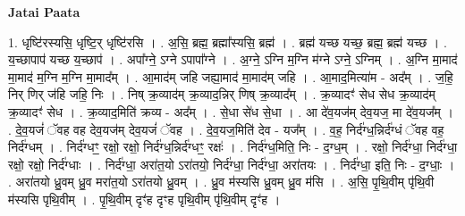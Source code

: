 \documentclass[17pt]{extarticle}
\begin{document}
\textbf{Jatai Paata} \newline

1. धृष्टि॑रस्यसि॒ धृष्टि॒र् धृष्टि॑रसि । . अ॒सि॒ ब्रह्म॒ ब्रह्मा᳚स्यसि॒ ब्रह्म॑ । . ब्रह्म॑ यच्छ यच्छ॒ ब्रह्म॒ ब्रह्म॑ यच्छ । . य॒च्छापाप॑ यच्छ य॒च्छाप॑ । . अपा᳚ग्ने॒ ऽग्ने ऽपापा᳚ग्ने । . अ॒ग्ने॒ ऽग्नि म॒ग्नि म॑ग्ने ऽग्ने॒ ऽग्निम् । . अ॒ग्नि मा॒माद॑ मा॒माद॑ म॒ग्नि म॒ग्नि मा॒माद᳚म् । . आ॒माद॑म् जहि जह्या॒माद॑ मा॒माद॑म् जहि । . आ॒माद॒मित्या॑म - अद᳚म् । . ज॒हि॒ निर् णिर् ज॑हि जहि॒ निः । . निष् क्र॒व्याद॑म् क्र॒व्याद॒न्निर् णिष् क्र॒व्याद᳚म् । . क्र॒व्यादꣳ॑ सेध सेध क्र॒व्याद॑म् क्र॒व्यादꣳ॑ सेध । . क्र॒व्याद॒मिति॑ क्रव्य - अद᳚म् । . से॒धा से॑ध से॒धा । . आ दे॑व॒यज॑म् देव॒यज॒ मा दे॑व॒यज᳚म् । . दे॒व॒यजं॑ ॅवह वह देव॒यज॑म् देव॒यजं॑ ॅवह । . दे॒व॒यज॒मिति॑ देव - यज᳚म् । . व॒ह॒ निर्द॑ग्ध॒न्निर्द॑ग्धं ॅवह वह॒ निर्द॑ग्धम् । . निर्द॑ग्धꣳ॒॒ रक्षो॒ रक्षो॒ निर्द॑ग्ध॒न्निर्द॑ग्धꣳ॒॒ रक्षः॑ । . निर्द॑ग्ध॒मिति॒ निः - द॒ग्ध॒म् । . रक्षो॒ निर्द॑ग्धा॒ निर्द॑ग्धा॒ रक्षो॒ रक्षो॒ निर्द॑ग्धाः । . निर्द॑ग्धा॒ अरा॑त॒यो ऽरा॑तयो॒ निर्द॑ग्धा॒ निर्द॑ग्धा॒ अरा॑तयः । . निर्द॑ग्धा॒ इति॒ निः - द॒ग्धाः॒ । . अरा॑तयो ध्रु॒वम् ध्रु॒व मरा॑त॒यो ऽरा॑तयो ध्रु॒वम् । . ध्रु॒व म॑स्यसि ध्रु॒वम् ध्रु॒व म॑सि । . अ॒सि॒ पृ॒थि॒वीम् पृ॑थि॒वी म॑स्यसि पृथि॒वीम् । . पृ॒थि॒वीम् दृꣳ॑ह दृꣳह पृथि॒वीम् पृ॑थि॒वीम् दृꣳ॑ह । \newline
\end{document}
